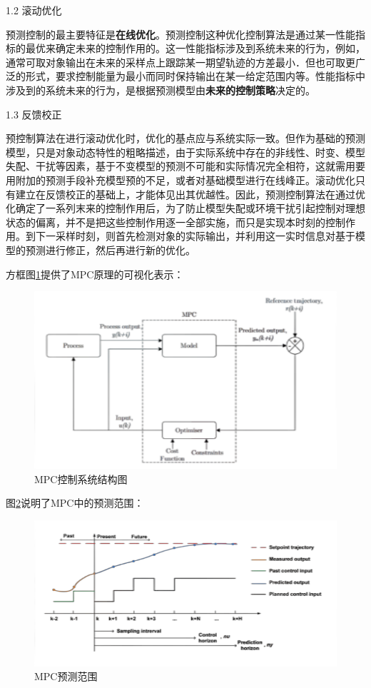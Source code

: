 1.2 滚动优化

预测控制的最主要特征是\textbf{在线优化}。预测控制这种优化控制算法是通过某一性能指标的最优来确定未来的控制作用的。这一性能指标涉及到系统未来的行为，例如，通常可取对象输出在未来的采样点上跟踪某一期望轨迹的方差最小．但也可取更广泛的形式，要求控制能量为最小而同时保持输出在某一给定范围内等。性能指标中涉及到的系统未来的行为，是根据预测模型由\textbf{未来的控制策略}决定的\cite{ArtE8}。

1.3 反馈校正

预控制算法在进行滚动优化时，优化的基点应与系统实际一致。但作为基础的预测模型，只是对象动态特性的粗略描述，由于实际系统中存在的非线性、时变、模型失配、干扰等因素，基于不变模型的预测不可能和实际情况完全相符，这就需用要用附加的预测手段补充模型预的不足，或者对基础模型进行在线峰正\cite{Art4}。滚动优化只有建立在反馈校正的基础上，才能体见出其优越性。因此，预测控制算法在通过优化确定了一系列末来的控制作用后，为了防止模型失配或环境干扰引起控制对理想状态的偏离，并不是把这些控制作用逐一全部实施，而只是实现本时刻的控制作用\cite{Art5}。到下一采样时刻，则首先检测对象的实际输出，并利用这一实时信息对基于模型的预测进行修正，然后再进行新的优化\cite{ArtE6}。

方框图\ref{Fig:img5}提供了MPC原理的可视化表示：

\begin{figure}[ht]
  \centering
  \includegraphics[width=0.8\linewidth]{./Figure/MPC-Control.png}
  \caption{MPC控制系统结构图}\label{Fig:img5}
\end{figure}

图\ref{Fig:img6}说明了MPC中的预测范围：

\begin{figure}[ht]
  \centering
  \includegraphics[width=0.8\linewidth]{./Figure/MPC-Prediction.png}
  \caption{MPC预测范围}\label{Fig:img6}
\end{figure}

